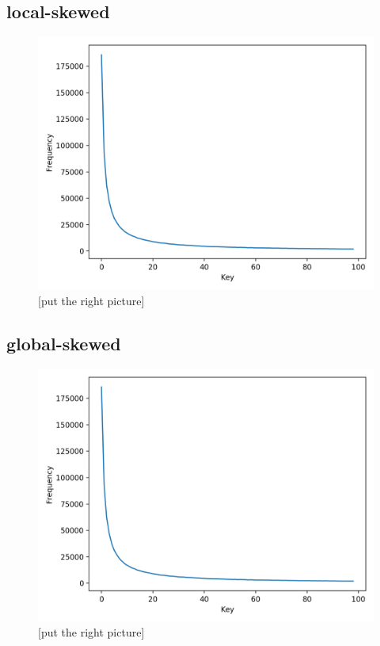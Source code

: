 \subsection{local-skewed}\label{sec:local-skewed}
\begin{figure}[!htb]
  \centering
  \includegraphics[width=\textwidth,height=\textheight,keepaspectratio]{img/skew-alpha1.png}
  \caption[caption]{ [put the right picture] }
  \label{fig:b+tree}
\end{figure}
\newpage
\subsection{global-skewed}\label{sec:global-skewed}
\begin{figure}[!htb]
  \centering
  \includegraphics[width=\textwidth,height=\textheight,keepaspectratio]{img/skew-alpha1.png}
  \caption[caption]{ [put the right picture] }
  \label{fig:b+tree}
\end{figure}
\newpage
